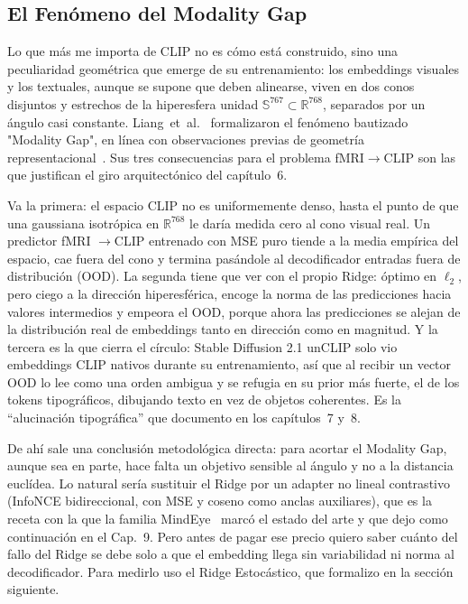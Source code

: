 \subsection{El Fenómeno del Modality Gap}\label{sec:modality_gap}

Lo que más me importa de CLIP no es cómo está construido, sino una peculiaridad geométrica que 
emerge de su entrenamiento: los embeddings visuales y los textuales, aunque se supone que deben 
alinearse, viven en dos conos disjuntos y estrechos de la hiperesfera unidad $\mathbb{S}^{767}\subset\mathbb{R}^{768}$, 
separados por un ángulo casi constante. Liang~et~al.~\cite{liang2022mind} formalizaron el 
fenómeno bautizado "Modality Gap", en línea con observaciones previas de geometría 
representacional~\cite{kriegeskorte2008representational}. Sus tres consecuencias para el 
problema fMRI$\rightarrow$CLIP son las que justifican el giro arquitectónico del capítulo~6.

Va la primera: el espacio CLIP no es uniformemente denso, hasta el punto de que una gaussiana 
isotrópica en $\mathbb{R}^{768}$ le daría medida cero al cono visual real. Un predictor fMRI
$\rightarrow$CLIP entrenado con MSE puro tiende a la media empírica del espacio, cae fuera del 
cono y termina pasándole al decodificador entradas fuera de distribución (OOD). La segunda 
tiene que ver con el propio Ridge: óptimo en $\ell_2$, pero ciego a la dirección hiperesférica, 
encoge la norma de las predicciones hacia valores intermedios y empeora el OOD, porque ahora 
las predicciones se alejan de la distribución real de embeddings tanto en dirección como en 
magnitud. Y la tercera es la que cierra el círculo: Stable Diffusion 2.1 unCLIP solo vio 
embeddings CLIP nativos durante su entrenamiento, así que al recibir un vector OOD lo lee como 
una orden ambigua y se refugia en su prior más fuerte, el de los tokens tipográficos, dibujando 
texto en vez de objetos coherentes. Es la ``alucinación tipográfica'' que documento en los 
capítulos~7 y~8.

De ahí sale una conclusión metodológica directa: para acortar el Modality Gap, aunque sea en 
parte, hace falta un objetivo sensible al ángulo y no a la distancia euclídea. Lo natural sería 
sustituir el Ridge por un adapter no lineal contrastivo (InfoNCE bidireccional, con MSE y 
coseno como anclas auxiliares), que es la receta con la que la familia MindEye~\cite{
scotti2023mindeye,scotti2024mindeye2} marcó el estado del arte y que dejo como continuación en 
el Cap.~9. Pero antes de pagar ese precio quiero saber cuánto del fallo del Ridge se debe solo 
a que el embedding llega sin variabilidad ni norma al decodificador. Para medirlo uso el Ridge 
Estocástico, que formalizo en la sección siguiente.

